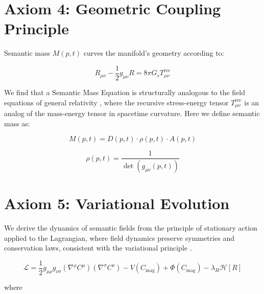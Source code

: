 
\section{Axiom 4: Geometric Coupling Principle}
\label{1.4:axiom_4_geometric_coupling_principle}

Semantic mass \(M(p,t)\) curves the manifold's geometry according to:

\begin{equation}
R_{\mu\nu} - \frac{1}{2}g_{\mu\nu}R = 8\pi G_s T^{\text{rec}}_{\mu\nu}
\end{equation}

We find that a Semantic Mass Equation is structurally analogous to the field equations of general relativity \autocite{Einstein1915, MisnerThorneWheeler1973, Wald1984}, where the recursive stress-energy tensor \(T^{\text{rec}}_{\mu\nu}\) is an analog of the mass-energy tensor in spacetime curvature. Here we define semantic mass as:

\begin{equation}
M(p,t) = D(p,t) \cdot \rho(p,t) \cdot A(p,t)
\end{equation}

\begin{equation}
\rho(p,t) = \frac{1}{\det(g_{\mu\nu}(p,t))}
\end{equation}


\section{Axiom 5: Variational Evolution}
\label{1.5:axiom_5_variational_evolution}

We derive the dynamics of semantic fields from the principle of stationary action applied to the Lagrangian, where field dynamics preserve symmetries and conservation laws, consistent with the variational principle \autocite{GoldsteinPooleSafko2002, Arnold1989}.

\begin{equation}
\mathcal{L} = \frac{1}{2} g_{\mu\rho} g_{\nu\sigma} (\nabla^\rho C^\mu)(\nabla^\sigma C^\nu) - V(C_{\text{mag}}) + \Phi(C_{\text{mag}}) - \lambda_H \mathcal{H}[R]
\end{equation}

where

